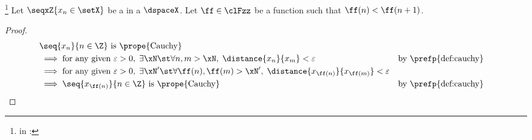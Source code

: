 \begin{proposition}
\footnote{
  in :
  }
\label{prop:cauchy_subseq}
Let $\seqxZ{x_n\in\setX}$ be a  in a  $\dspaceX$. %
Let $\ff\in\clFzz$  be a  function such that $\ff(n)<\ff(n+1)$.
\end{proposition}
\begin{proof}
\begin{align*}
  &\text{$\seq{x_n}{n\in\Z}$ is \prope{Cauchy}}
  \\&\implies \text{for any given } \varepsilon>0,\; \exists\xN \st \forall n,m>\xN,\; \distance{x_n}{x_m}<\varepsilon
    &&        \text{by \prefp{def:cauchy}}
  \\&\implies \text{for any given } \varepsilon>0,\; \exists\xN' \st \forall \ff(n),\ff(m)>\xN',\; \distance{x_{\ff(n)}}{x_{\ff(m)}}<\varepsilon
  \\&\implies \seq{x_{\ff(n)}}{n\in\Z} \text{ is \prope{Cauchy}}
    &&        \text{by \prefp{def:cauchy}}
\end{align*}
\end{proof}




